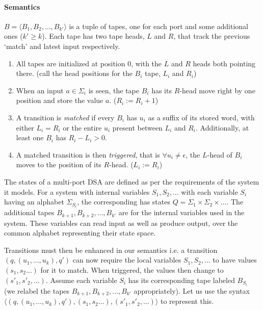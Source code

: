 \paragraph*{Semantics} $B=\langle B_1,B_2,\dots,B_{k'} \rangle$ is a tuple of tapes, one for each port and some additional ones ($k'\ge k$). Each tape has two tape heads, $L$ and $R$, that track the previous `match' and latest input respectively. 

\begin{enumerate}
\item All tapes are initialized at position 0, with the $L$ and $R$ heads both pointing there. (call the head positions for the $B_i$ tape, $L_i$ and $R_i$)

\item When an input $a \in \Sigma_i$ is seen, the tape $B_i$ has its $R$-head move right by one position and store the value $a$. ($R_i := R_i+1$)

\item A transition is \emph{matched} if every $B_i$ has $u_i$ as a suffix of its stored word, with either $L_i=R_i$ or the entire $u_i$ present between $L_i$ and $R_i$. Additionally, at least one $B_i$ has $R_i-L_i>0$.

\item A matched transition is then \emph{triggered}, that is $\forall u_i \ne \epsilon$, the $L$-head of $B_i$ moves to the position of its $R$-head. ($L_i := R_i$)
\end{enumerate}

The states of a multi-port DSA are defined as per the requirements of the system it models. For a system with internal variables $S_1,S_2,\dots$ with each variable $S_i$ having an alphabet $\Sigma_{S_i}$, the corresponding \mdsa has states $Q=\Sigma_1 \times \Sigma_2 \times \dots$. The additional tapes $B_{k+1}, B_{k+2}, \dots, B_{k'}$ are for the internal variables used in the system. These variables can read input as well as produce output, over the common alphabet representing their state space. %

Transitions must then be enhanced in our semantics i.e.  a transition $(q, (u_1, \dots, u_k), q')$ can now require the local variables $S_1, S_2,\dots$ to have values $(s_1, s_2 \dots)$  for it to match. When triggered, the values then change to $(s'_1,s'_2,\dots)$. Assume each variable $S_i$ has its corresponding tape labeled $B_{S_i}$ (we relabel the tapes $B_{k+1}, B_{k+2}, \dots, B_{k'}$ appropriately). Let us use the syntax $\langle (q, (u_1, \dots, u_k), q') , (s_1, s_2 \dots), (s'_1,s'_2,\dots) \rangle$ to represent this.

